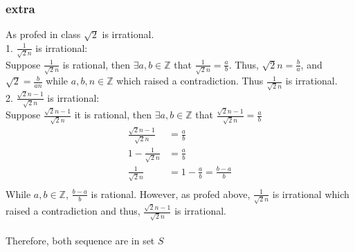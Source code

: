 \documentclass{article}
\begin{document}
\subsubsection*{extra}
As profed in class \(\sqrt 2\) is irrational.\\
1. $\frac{1}{\sqrt 2 n}$ is irrational:\\
Suppose $\frac{1}{\sqrt 2 n}$ is rational, then \(\exists a,b \in \mathbb{Z}\) that \(\frac{1}{\sqrt 2 n}=\frac{a}{b}\). Thus, \(\sqrt 2 n = \frac{b}{a}\), 
and \(\sqrt{2}=\frac{b}{an}\) while \(a,b,n\in\mathbb{Z}\) which raised a contradiction. Thus \(\frac{1}{\sqrt 2 n}\) is irrational.\\
2. \(\frac{\sqrt 2 n -1}{\sqrt 2 n}\) is irrational:\\
Suppose \(\frac{\sqrt 2 n -1}{\sqrt 2 n}\) it is rational, then \(\exists a,b \in \mathbb{Z}\) that \(\frac{\sqrt 2 n -1}{\sqrt 2 n}= \frac{a}{b}\)
\begin{align*}
    \frac{\sqrt 2 n -1}{\sqrt 2 n}&=\frac{a}{b}\\
    1-\frac{1}{\sqrt 2 n}&=\frac{a}{b}\\
    \frac{1}{\sqrt 2 n}&=1-\frac{a}{b}=\frac{b-a}{b}\\
\end{align*}
While \(a,b\in\mathbb{Z}\), \(\frac{b-a}{b}\) is rational. However, as profed above, $\frac{1}{\sqrt 2 n}$ is irrational which raised a contradiction and 
thus, \(\frac{\sqrt 2 n -1}{\sqrt 2 n}\) is irrational.
\\
\\
Therefore, both sequence are in set \(S\)







\newpage
\end{document}
